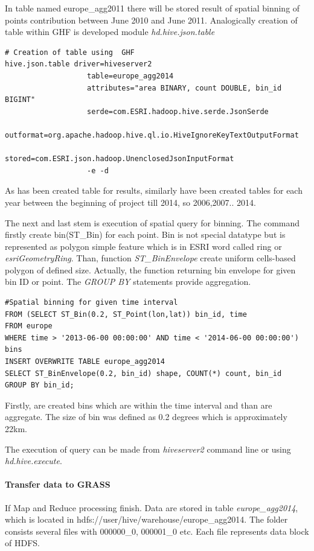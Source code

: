 \documentclass[a4paper,12pt,oneside]{report}
\begin{document}
	In table named europe\_agg2011 there will be stored result of spatial binning of points contribution between June 2010 and June 2011.
	Analogically creation of table within GHF is developed module \textit{hd.hive.json.table}
\begin{footnotesize}
	\begin{lstlisting}[style=python]
# Creation of table using  GHF
hive.json.table driver=hiveserver2
                   table=europe_agg2014
                   attributes="area BINARY, count DOUBLE, bin_id BIGINT"
                   serde=com.ESRI.hadoop.hive.serde.JsonSerde
                   outformat=org.apache.hadoop.hive.ql.io.HiveIgnoreKeyTextOutputFormat
                   stored=com.ESRI.json.hadoop.UnenclosedJsonInputFormat
                   -e -d
	\end{lstlisting}
\end{footnotesize}
	As has been created table for results, similarly have been created tables for each year between 
	the beginning of project till 2014, so 2006,2007.. 2014. 
	
	
	The next and last stem is execution of spatial query for binning. The command firstly create bin(ST\_Bin) for each point. Bin is not special datatype but is represented as polygon simple feature which is in ESRI word called ring or \textit{esriGeometryRing}. Than, function \textit{ST\_BinEnvelope} create uniform  cells-based polygon of defined size. Actually, the function returning bin envelope for given bin ID or point. The \textit{GROUP BY} statements provide aggregation.
\begin{footnotesize}
	\begin{lstlisting}[style=python]
#Spatial binning for given time interval
FROM (SELECT ST_Bin(0.2, ST_Point(lon,lat)) bin_id, time 
FROM europe 
WHERE time > '2013-06-00 00:00:00' AND time < '2014-06-00 00:00:00') bins
INSERT OVERWRITE TABLE europe_agg2014
SELECT ST_BinEnvelope(0.2, bin_id) shape, COUNT(*) count, bin_id 
GROUP BY bin_id;
	\end{lstlisting}
\end{footnotesize}
	Firstly, are created bins which are within the time interval and than are aggregate.
	The size of bin was defined as 0.2 degrees which is approximately 22km.
	
	The execution of query can be made from \textit{hiveserver2} command line or using \textit{hd.hive.execute}. 
	
	\paragraph{Transfer data to GRASS}
	If Map and Reduce processing finish. Data are stored in table \textit{europe\_agg2014}, 
	which is located in hdfs://user/hive/warehouse/europe\_agg2014. The folder consists several
	files with 000000\_0, 000001\_0 etc. Each file represents data block of HDFS.  
\end{document}
